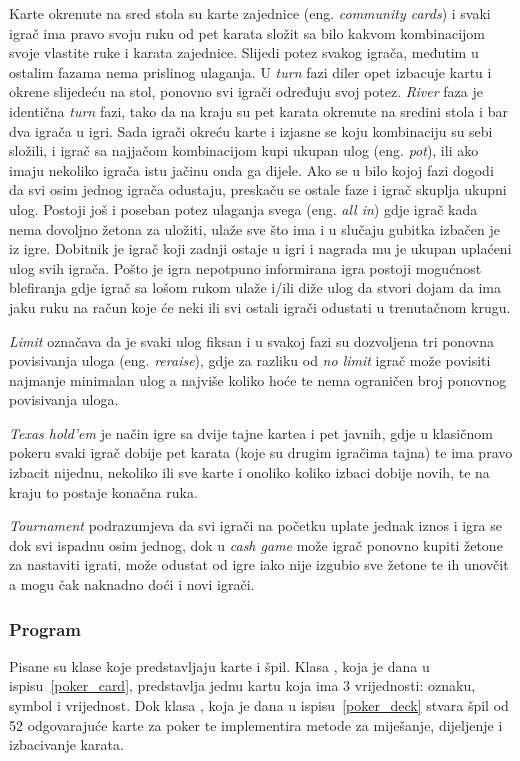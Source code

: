 Karte okrenute na sred stola su karte zajednice (eng. \textit{community cards}) i svaki igrač ima pravo svoju ruku od pet karata složit sa bilo kakvom kombinacijom svoje vlastite ruke i karata zajednice. Slijedi potez svakog igrača, međutim u ostalim fazama nema prislinog ulaganja. U \emph{turn} fazi diler opet izbacuje kartu i okrene slijedeću na stol, ponovno svi igrači određuju svoj potez. \emph{River} faza je identična \emph{turn} fazi, tako da na kraju su pet karata okrenute na sredini stola i bar dva igrača u igri. Sada igrači okreću karte i izjasne se koju kombinaciju su sebi složili, i igrač sa najjačom kombinacijom kupi ukupan ulog (eng. \textit{pot}), ili ako imaju nekoliko igrača istu jačinu onda ga dijele. Ako se u bilo kojoj fazi dogodi da svi osim jednog igrača odustaju, preskaču se ostale faze i igrač skuplja ukupni ulog. Postoji još i poseban potez ulaganja svega (eng. \textit{all in}) gdje igrač kada nema dovoljno žetona za uložiti, ulaže sve što ima i u slučaju gubitka izbačen je iz igre. Dobitnik je igrač koji zadnji ostaje u igri i nagrada mu je ukupan uplaćeni ulog svih igrača. Pošto je igra nepotpuno informirana igra postoji mogućnost blefiranja gdje igrač sa lošom rukom ulaže i/ili diže ulog da stvori dojam da ima jaku ruku na račun koje će neki ili svi ostali igrači odustati u trenutačnom krugu.


\emph{Limit} označava da je svaki ulog fiksan i u svakoj fazi su dozvoljena tri ponovna povisivanja uloga (eng. \textit{reraise}), gdje za razliku od \emph{no limit} igrač može povisiti najmanje minimalan ulog a najviše koliko hoće te nema ograničen broj ponovnog povisivanja uloga.

\emph{Texas hold'em} je način igre sa dvije tajne kartea i pet javnih, gdje u klasičnom pokeru svaki igrač dobije pet karata (koje su drugim igračima tajna) te ima pravo izbacit nijednu, nekoliko ili sve karte i onoliko koliko izbaci dobije novih, te na kraju to postaje konačna ruka.

\emph{Tournament} podrazumjeva da svi igrači na početku uplate jednak iznos i igra se dok svi ispadnu osim jednog, dok u \emph{cash game} može igrač ponovno kupiti žetone za nastaviti igrati, može odustat od igre 
iako nije izgubio sve žetone te ih unovčit a mogu čak naknadno doći i novi igrači.

\subsubsection{Program}
Pisane su klase koje predstavljaju karte i špil. Klasa , koja je dana u ispisu~\ref{poker_card}, predstavlja jednu kartu koja ima 3 vrijednosti: oznaku, symbol i vrijednost. Dok klasa , koja je dana u ispisu~\ref{poker_deck} stvara špil od 52 odgovarajuće karte za poker te implementira metode za miješanje, dijeljenje i izbacivanje karata.

